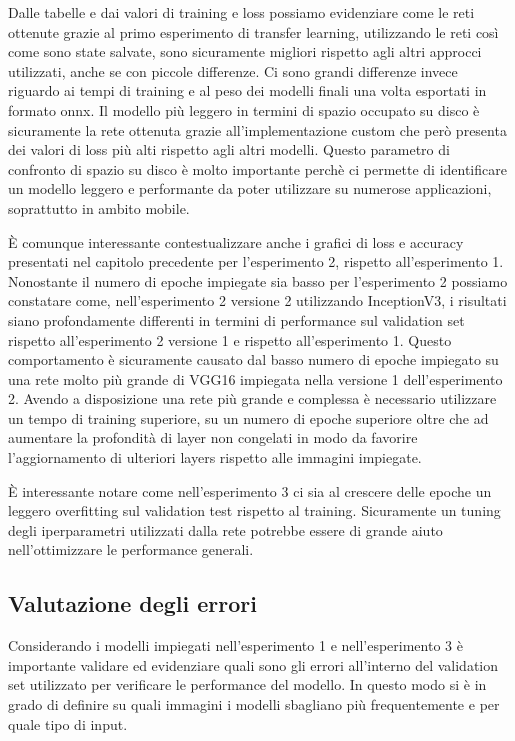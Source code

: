 Dalle tabelle e dai valori di training e loss possiamo evidenziare come le reti ottenute grazie al primo esperimento di transfer learning, utilizzando le reti così come sono state salvate, sono sicuramente migliori rispetto agli altri approcci utilizzati, anche se con piccole differenze.
Ci sono grandi differenze invece riguardo ai tempi di training e al peso dei modelli finali una volta esportati in formato onnx.  
Il modello più leggero in termini di spazio occupato su disco è sicuramente la rete ottenuta grazie all'implementazione custom che però presenta dei valori di loss più alti rispetto agli altri modelli.
Questo parametro di confronto di spazio su disco è molto importante perchè ci permette di identificare un modello leggero e performante da poter utilizzare su numerose applicazioni, soprattutto in ambito mobile.  \bigskip

È comunque interessante contestualizzare anche i grafici di loss e accuracy presentati nel capitolo precedente per l'esperimento 2, rispetto all'esperimento 1.  
Nonostante il numero di epoche impiegate sia basso per l'esperimento 2 possiamo constatare come, nell'esperimento 2 versione 2 utilizzando InceptionV3, i risultati siano profondamente differenti in termini di performance sul validation set rispetto all'esperimento 2 versione 1 e rispetto all'esperimento 1.  
Questo comportamento è sicuramente causato dal basso numero di epoche impiegato su una rete molto più grande di VGG16 impiegata nella versione 1 dell'esperimento 2.
Avendo a disposizione una rete più grande e complessa è necessario utilizzare un tempo di training superiore, su un numero di epoche superiore oltre che ad aumentare la profondità di layer non congelati in modo da favorire l'aggiornamento di ulteriori layers rispetto alle immagini impiegate. \bigskip

È interessante notare come nell'esperimento 3 ci sia al crescere delle epoche un leggero overfitting sul validation test rispetto al training. Sicuramente un tuning degli iperparametri utilizzati dalla rete potrebbe essere di grande aiuto nell'ottimizzare le performance generali.

\subsection{Valutazione degli errori}

Considerando i modelli impiegati nell'esperimento 1 e nell'esperimento 3 è importante validare ed evidenziare quali sono gli errori all'interno del validation set utilizzato per verificare le performance del modello.
In questo modo si è in grado di definire su quali immagini i modelli sbagliano più frequentemente e per quale tipo di input.

